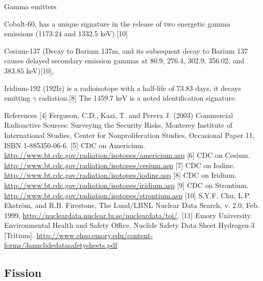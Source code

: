 \documentclass{report}
\begin{document}
Gamma emitters

Cobalt-60, has a unique signature in the release of two energetic gamma emissions (1173.24 and 1332.5 keV).[10]

Cesium-137 (Decay to Barium 137m, and its subsequent decay to Barium 137 causes delayed secondary emission gammas at 80.9, 276.4, 302.9, 356.02, and 383.85 keV)[10],

Iridium-192 (192Ir) is a radioisotope with a half-life of 73.83 days, it decays emitting \(\gamma\) radiation.[8]  The 1459.7 keV is a noted identification signature.



References
[4] 	Ferguson, C.D., Kazi, T. and Perera J. (2003) Commercial Radioactive Sources: Surveying the Security Risks, Monterey Institute of International Studies, Center for Nonproliferation Studies, Occasional Paper 11, ISBN 1-885350-06-6.
[5]	CDC on Americium. \url{http://www.bt.cdc.gov/radiation/isotopes/americium.asp}
[6]	CDC on Cesium.  \url{http://www.bt.cdc.gov/radiation/isotopes/cesium.asp}
[7]	CDC on Iodine.  \url{http://www.bt.cdc.gov/radiation/isotopes/iodine.asp}
[8]	CDC on Iridium.  \url{http://www.bt.cdc.gov/radiation/isotopes/iridium.asp}
[9]	CDC on Strontium.  \url{http://www.bt.cdc.gov/radiation/isotopes/strontium.asp}
[10] 	S.Y.F. Chu, L.P. Ekström, and R.B. Firestone, The Lund/LBNL Nuclear Data Search, v. 2.0, Feb. 1999, \url{http://nucleardata.nuclear.lu.se/nucleardata/toi/}.
[11]	Emory University. Environmental Health and Safety Office. Nuclide Safety Data Sheet Hydrogen-3 [Tritium]. \url{http://www.ehso.emory.edu/content-forms/3anuclidedatasafetysheets.pdf}




\subsection{Fission}
\end{document}
